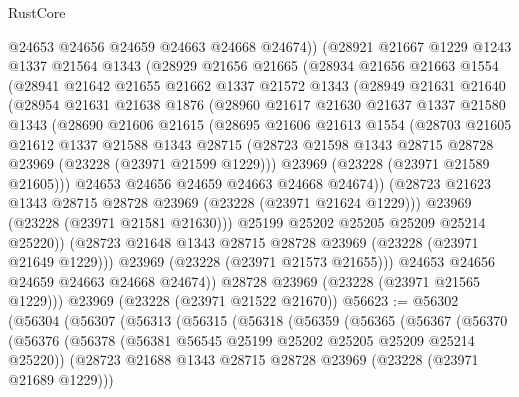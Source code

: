 \begin{lexlean}{RustCore}
\begin{coremodule}
        @24653
        @24656
        @24659
        @24663
        @24668
        @24674))
    (@28921
      @21667
      @1229
      @1243
      @1337
      @21564
      @1343
      (@28929
        @21656
        @21665
        (@28934
          @21656
          @21663
          @1554
          (@28941
            @21642
            @21655
            @21662
            @1337
            @21572
            @1343
            (@28949
              @21631
              @21640
              (@28954
                @21631
                @21638
                @1876
                (@28960
                  @21617
                  @21630
                  @21637
                  @1337
                  @21580
                  @1343
                  (@28690
                    @21606
                    @21615
                    (@28695
                      @21606
                      @21613
                      @1554
                      (@28703
                        @21605
                        @21612
                        @1337
                        @21588
                        @1343
                        @28715
                        (@28723 @21598 @1343 @28715 @28728 @23969 (@23228 (@23971 @21599 @1229)))
                        @23969
                        (@23228 (@23971 @21589 @21605)))
                      @24653
                      @24656
                      @24659
                      @24663
                      @24668
                      @24674))
                  (@28723 @21623 @1343 @28715 @28728 @23969 (@23228 (@23971 @21624 @1229)))
                  @23969
                  (@23228 (@23971 @21581 @21630)))
                @25199
                @25202
                @25205
                @25209
                @25214
                @25220))
            (@28723 @21648 @1343 @28715 @28728 @23969 (@23228 (@23971 @21649 @1229)))
            @23969
            (@23228 (@23971 @21573 @21655)))
          @24653
          @24656
          @24659
          @24663
          @24668
          @24674))
      @28728
      @23969
      (@23228 (@23971 @21565 @1229)))
    @23969
    (@23228 (@23971 @21522 @21670))
@56623 := @56302
    (@56304
      (@56307
        (@56313
          (@56315
            (@56318
              (@56359
                (@56365
                  (@56367
                    (@56370
                      (@56376
                        (@56378 (@56381 @56545 @25199 @25202 @25205 @25209 @25214 @25220))
                        (@28723 @21688 @1343 @28715 @28728 @23969 (@23228 (@23971 @21689 @1229)))

\end{coremodule}
\end{lexlean}
